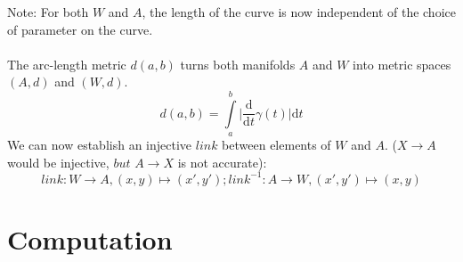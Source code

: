 \documentclass{report}
\begin{document}
Note: For both $W$ and $A$, the length of the curve is now independent of the choice of parameter on the curve. ~\cite[1.1]{Taimanov}\\\\
The arc-length metric $d(a,b)$ turns both manifolds $A$ and $W$ into metric spaces $(A,d)$ and $(W,d)$. ~\cite[1.1.3]{Klingenberg}
\begin{equation}
d(a,b) = \int \limits _{a}^{b}\lvert \frac{\mathrm{d}}{\mathrm{d}t}\gamma(t)\rvert \mathrm{d}t\label{eq:1}
\end{equation}
We can now establish an injective $link$ between elements of $W$ and $A$. ($X \rightarrow A$ would be injective, $but$ $A \rightarrow X$ is not accurate):
\begin{equation}
link: W \rightarrow A, (x,y) \mapsto (x',y'); link^{-1}: A \rightarrow W, (x',y') \mapsto (x,y)
\end{equation}

\chapter{Computation}
\end{document}
